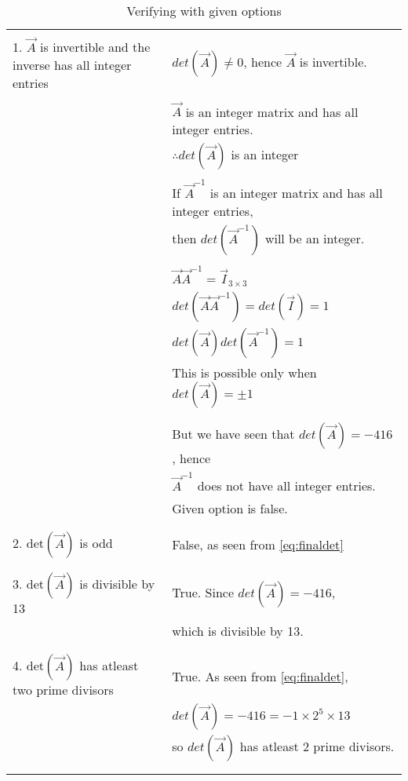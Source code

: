 \documentclass[journal,12pt]{IEEEtran}
\begin{document}
\begin{longtable}{|l|l|}
    \hline
        & \\
        1. $\vec{A}$ is invertible and the inverse has all integer entries & $det(\vec{A}) \neq 0$, hence $\vec{A}$ is invertible.\\
        & \\
        & $\vec{A}$ is an integer matrix and has all integer entries.\\
        & $\therefore det(\vec{A})$ is an integer\\
        & \\
        & If $\vec{A}^{-1}$ is an integer matrix and has all integer entries,\\ & then $det(\vec{A}^{-1})$ will be an integer.\\
        & \\
        & $\vec{A}\vec{A}^{-1} = \vec{I}_{3 \times 3}$\\
        & $det(\vec{A}\vec{A}^{-1}) = det(\vec{I}) = 1$\\
        & $det(\vec{A})det(\vec{A}^{-1}) = 1$\\
        & This is possible only when $det(\vec{A}) = \pm 1$\\
        & \\
    \hline
        & \\
        & But we have seen that $det(\vec{A}) = -416$, hence\\
        & $\vec{A}^{-1}$ does not have all integer entries.\\
        & Given option is false.\\
        & \\
    \hline
        & \\
        2. det$(\vec{A})$ is odd & False, as seen from \eqref{eq:finaldet}\\
        & \\
    \hline
        & \\
        3. det$(\vec{A})$ is divisible by 13 & True. Since $det(\vec{A}) = -416$,\\
        & which is divisible by 13.\\
        & \\
    \hline
        & \\
        4. det$(\vec{A})$ has atleast two prime divisors & True. As seen from \eqref{eq:finaldet},\\
        & $det(\vec{A}) = -416 = -1 \times 2^5 \times 13$\\
        & so $det(\vec{A})$ has atleast 2 prime divisors.\\
        & \\
    \hline
    \caption{Verifying with given options}
    \label{tab:verify}
\end{longtable}
\end{document}
